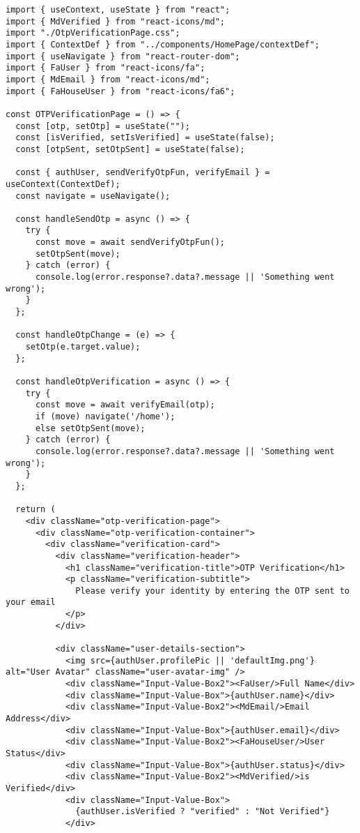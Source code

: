 \documentclass[12pt,a4paper]{report}
\begin{document}
\begin{lstlisting}
import { useContext, useState } from "react";
import { MdVerified } from "react-icons/md";
import "./OtpVerificationPage.css";
import { ContextDef } from "../components/HomePage/contextDef";
import { useNavigate } from "react-router-dom";
import { FaUser } from "react-icons/fa";
import { MdEmail } from "react-icons/md";
import { FaHouseUser } from "react-icons/fa6";

const OTPVerificationPage = () => {
  const [otp, setOtp] = useState("");
  const [isVerified, setIsVerified] = useState(false);
  const [otpSent, setOtpSent] = useState(false);

  const { authUser, sendVerifyOtpFun, verifyEmail } = useContext(ContextDef);
  const navigate = useNavigate();

  const handleSendOtp = async () => {
    try {
      const move = await sendVerifyOtpFun();
      setOtpSent(move);
    } catch (error) {
      console.log(error.response?.data?.message || 'Something went wrong');
    }
  };

  const handleOtpChange = (e) => {
    setOtp(e.target.value);
  };

  const handleOtpVerification = async () => {
    try {
      const move = await verifyEmail(otp);
      if (move) navigate('/home');
      else setOtpSent(move);
    } catch (error) {
      console.log(error.response?.data?.message || 'Something went wrong');
    }
  };

  return (
    <div className="otp-verification-page">
      <div className="otp-verification-container">
        <div className="verification-card">
          <div className="verification-header">
            <h1 className="verification-title">OTP Verification</h1>
            <p className="verification-subtitle">
              Please verify your identity by entering the OTP sent to your email
            </p>
          </div>

          <div className="user-details-section">
            <img src={authUser.profilePic || 'defaultImg.png'} alt="User Avatar" className="user-avatar-img" />
            <div className="Input-Value-Box2"><FaUser/>Full Name</div>
            <div className="Input-Value-Box">{authUser.name}</div>
            <div className="Input-Value-Box2"><MdEmail/>Email Address</div>
            <div className="Input-Value-Box">{authUser.email}</div>
            <div className="Input-Value-Box2"><FaHouseUser/>User Status</div>
            <div className="Input-Value-Box">{authUser.status}</div>
            <div className="Input-Value-Box2"><MdVerified/>is Verified</div>
            <div className="Input-Value-Box">
              {authUser.isVerified ? "verified" : "Not Verified"}
            </div>


\end{lstlisting}
\end{document}
